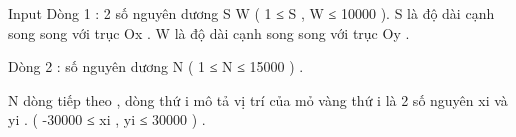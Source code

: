 Input
Dòng 1 : 2 số nguyên dương S W ( 1 ≤ S , W ≤ 10000 ). S là độ dài cạnh song song với trục Ox . W là độ dài cạnh song song với trục Oy .   


   Dòng 2 : số nguyên dương N ( 1 ≤ N ≤ 15000 ) .   


   N dòng tiếp theo , dòng thứ i mô tả vị trí của mỏ vàng thứ i là 2 số nguyên xi và yi . ( -30000 ≤ xi , yi ≤ 30000 ) .